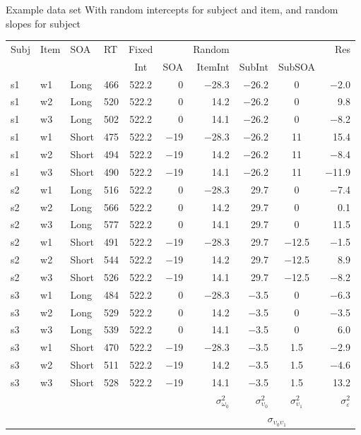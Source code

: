 \documentclass[aspectratio=169]{beamer}
\begin{document}
\begin{frame}[shrink=34]{Example data set}
With random intercepts for subject and item, and random slopes for
  subject\\[1.5ex]
  \centering
  \begin{tabular}{llllcrrrcr}
    \hline
    Subj & Item & SOA & RT & Fixed &&  Random &&& Res \\
    \cline{5-6}
    \cline{7-10}
    & & & & Int & SOA & ItemInt & SubInt & SubSOA & \\
    \hline
    s1 & w1 & Long  & 466 & 522.2 & 0     & $-$28.3 & $-$26.2 & 0       & $-$2.0 \\
    s1 & w2 & Long  & 520 & 522.2 & 0     & 14.2    & $-$26.2 & 0       & 9.8 \\
    s1 & w3 & Long  & 502 & 522.2 & 0     & 14.1    & $-$26.2 & 0       & $-$8.2 \\
    s1 & w1 & Short & 475 & 522.2 & $-$19 & $-$28.3 & $-$26.2 & 11      & 15.4 \\
    s1 & w2 & Short & 494 & 522.2 & $-$19 & 14.2    & $-$26.2 & 11      & $-$8.4 \\
    s1 & w3 & Short & 490 & 522.2 & $-$19 & 14.1    & $-$26.2 & 11      & $-$11.9 \\
    s2 & w1 & Long  & 516 & 522.2 & 0     & $-$28.3 & 29.7    & 0       & $-$7.4 \\
    s2 & w2 & Long  & 566 & 522.2 & 0     & 14.2    & 29.7    & 0       & 0.1 \\
    s2 & w3 & Long  & 577 & 522.2 & 0     & 14.1    & 29.7    & 0       & 11.5 \\
    s2 & w1 & Short & 491 & 522.2 & $-$19 & $-$28.3 & 29.7    & $-$12.5 & $-$1.5 \\
    s2 & w2 & Short & 544 & 522.2 & $-$19 & 14.2    & 29.7    & $-$12.5 & 8.9 \\
    s2 & w3 & Short & 526 & 522.2 & $-$19 & 14.1    & 29.7    & $-$12.5 & $-$8.2 \\
    s3 & w1 & Long  & 484 & 522.2 & 0     & $-$28.3 & $-$3.5  & 0       & $-$6.3 \\
    s3 & w2 & Long  & 529 & 522.2 & 0     & 14.2    & $-$3.5  & 0       & $-$3.5 \\
    s3 & w3 & Long  & 539 & 522.2 & 0     & 14.1    & $-$3.5  & 0       & 6.0 \\
    s3 & w1 & Short & 470 & 522.2 & $-$19 & $-$28.3 & $-$3.5  & 1.5     & $-$2.9 \\
    s3 & w2 & Short & 511 & 522.2 & $-$19 & 14.2    & $-$3.5  & 1.5     & $-$4.6 \\
    s3 & w3 & Short & 528 & 522.2 & $-$19 & 14.1    & $-$3.5  & 1.5     & 13.2 \\
    \hline
    &&&&&& $\sigma^2_{\omega_0}$ & $\sigma^2_{\upsilon_0}$ &
    $\sigma^2_{\upsilon_1}$ & $\sigma^2_{\varepsilon}$\\ 
    &&&&&&  & \multicolumn{2}{c}{$\sigma_{\upsilon_0\upsilon_1}$} & 
  \end{tabular}
\end{frame}
\end{document}
